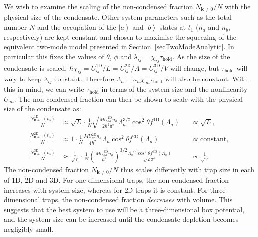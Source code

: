 \documentclass{iopart}
\newcommand{\ket}[1]{\ensuremath{\left|#1\right>}}
\begin{document}
We wish to examine the scaling of the non-condensed fraction $N_{\mathbf{k}\neq0}/N$ with the physical size of the condensate.  Other system parameters such as the total number $N$ and the occupation of the $\ket{a}$ and $\ket{b}$ states at $t_1$ ($n_a$ and $n_b$, respectively) are kept constant and chosen to maximise the squeezing of the equivalent two-mode model presented in Section~\ref{secTwoModeAnalytic}.  In particular this fixes the values of $\theta$, $\phi$ and $\lambda_{ij} = \chi_{ij}\tau_\text{hold}$.  As the size of the condensate is scaled, $\hbar \chi_{ij} = U^\text{1D}_{ij}/L = U^\text{2D}_{ij}/A = U^\text{3D}_{ij}/V$ will change, but $\tau_\text{hold}$ will vary to keep $\lambda_{ij}$ constant.  Therefore $\Lambda_a = n_a\chi_{aa}\tau_\text{hold}$ will also be constant.  With this in mind, we can write $\tau_\text{hold}$ in terms of the system size and the nonlinearity $U_{aa}$.  The non-condensed fraction can then be shown to scale with the physical size of the condensate as:
\begin{align}
  \frac{N^\text{1D}_{\mathbf{k}\neq 0}(t_3)}{N} &\approx \sqrt{L} \cdot \frac{1}{N} \sqrt{\frac{M U^\text{1D}_{aa} n_a}{2 \hbar^2 \pi^2}} \Lambda_a^{3/2} \cos^2\theta f^\text{1D}(\Lambda_a) &&\propto \sqrt{L}, \\
  \frac{N^\text{2D}_{\mathbf{k}\neq 0}(t_3)}{N} &\approx 1 \cdot \frac{1}{N} \frac{M U^\text{2D}_{aa} n_a }{4 \hbar^2} \Lambda_a \cos^2\theta f^\text{2D}(\Lambda_a) &&\propto \text{constant}, \\
  \frac{N^\text{3D}_{\mathbf{k}\neq 0}(t_3)}{N} &\approx \frac{1}{\sqrt{V}} \cdot \frac{1}{N} \left(\frac{M U^\text{3D}_{aa} n_a}{\hbar^2}\right)^{3/2} \frac{\Lambda_a^{1/2} \cos^2\theta f^\text{3D}(\Lambda_a)}{\sqrt{2} \pi^2} &&\propto \frac{1}{\sqrt{V}}.
\end{align}
The non-condensed fraction $N_{\mathbf{k}\neq 0}/N$ thus scales differently with trap size in each of 1D, 2D and 3D.  For one-dimensional traps, the non-condensed fraction increases with system size, whereas for 2D traps it is constant.  For three-dimensional traps, the non-condensed fraction \emph{decreases} with volume.  This suggests that the best system to use will be a three-dimensional box potential, and the system size can be increased until the condensate depletion becomes negligibly small.

\end{document}
